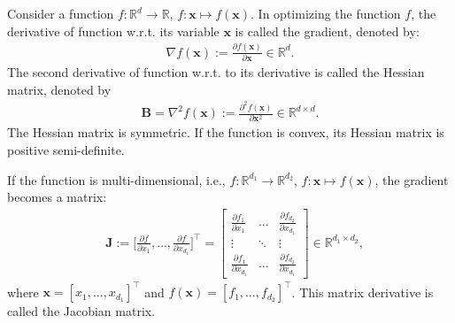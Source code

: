 \documentclass[lang=cn,10pt]{gorgeousnbook}
\numberwithin{equation}{section}%
\numberwithin{figure}{section}%
\begin{document}
\begin{definition}
Consider a function $f: \mathbb{R}^{d} \rightarrow \mathbb{R}$, $f: \boldsymbol{x} \mapsto f(\boldsymbol{x})$. In optimizing the function $f$, the derivative of function w.r.t. its variable $\boldsymbol{x}$ is called the gradient, denoted by:
\begin{align*}
\nabla f(\boldsymbol{x}) := \frac{\partial f(\boldsymbol{x})}{\partial \boldsymbol{x}} \in \mathbb{R}^d.
\end{align*}
The second derivative of function w.r.t. to its derivative is called the Hessian matrix, denoted by 
\begin{align*}
\boldsymbol{B} = \nabla^2 f(\boldsymbol{x}) := \frac{\partial^2 f(\boldsymbol{x})}{\partial \boldsymbol{x}^2} \in \mathbb{R}^{d \times d}. 
\end{align*}
The Hessian matrix is symmetric. If the function is convex, its Hessian matrix is positive semi-definite. 

If the function is multi-dimensional, i.e., $f: \mathbb{R}^{d_1} \rightarrow \mathbb{R}^{d_2}$, $f: \boldsymbol{x} \mapsto f(\boldsymbol{x})$, the gradient becomes a matrix:
\begin{align*}
& \boldsymbol{J} := \Big[\frac{\partial f}{\partial x_1}, \dots, \frac{\partial f}{\partial x_{d_1}}\Big]^\top\! = 
\begin{bmatrix}
\frac{\partial f_1}{\partial x_1} & \dots & \frac{\partial f_{d_2}}{\partial x_{d_1}}\\
\vdots & \ddots & \vdots \\
\frac{\partial f_{1}}{\partial x_{d_1}} & \dots & \frac{\partial f_{d_2}}{\partial x_{d_1}}
\end{bmatrix}
\!\!\in \mathbb{R}^{d_1 \times d_2},
\end{align*}
where $\boldsymbol{x} = [x_1, \dots, x_{d_1}]^\top$ and $f(\boldsymbol{x}) = [f_1, \dots, f_{d_2}]^\top$. 
This matrix derivative is called the Jacobian matrix. 
\end{definition}
\end{document}
